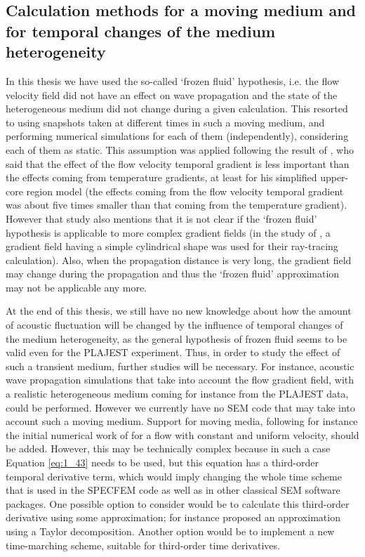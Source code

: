 \subsection*{Calculation methods for a moving medium and for temporal changes of the medium heterogeneity}

In this thesis we have used the so-called `frozen fluid' hypothesis, i.e. the flow velocity field did not have an effect on wave propagation
and the state of the heterogeneous medium did not change during a given calculation. This resorted to using snapshots taken at different times
in such a moving medium, and performing numerical simulations for each of them (independently), considering each of them as static.
This assumption was applied following the result of \cite{Massacret2012Simplifiedmodelingof}, who said that the effect of the flow velocity temporal gradient is less important
than the effects coming from temperature gradients, at least for his simplified upper-core region model
(the effects coming from the flow velocity temporal gradient was about five times smaller than that coming from the temperature gradient).
However that study also mentions that it is not clear if the `frozen fluid' hypothesis is applicable to more complex gradient fields
(in the study of \cite{Massacret2012Simplifiedmodelingof}, a gradient field having a simple cylindrical shape was used for their ray-tracing calculation).
Also, when the propagation distance is very long, the gradient field may change during the propagation and thus the `frozen fluid' approximation may not be applicable any more.

\noindent
At the end of this thesis, we still have no new knowledge about how the amount of acoustic fluctuation will be changed
by the influence of temporal changes of the medium heterogeneity, as the general hypothesis of frozen fluid seems to be valid even for the PLAJEST experiment.
Thus, in order to study the effect of such a transient medium, further studies will be necessary. For instance, acoustic wave propagation simulations
that take into account the flow gradient field, with a realistic heterogeneous medium coming for instance from the PLAJEST data, could be performed.
However we currently have no SEM code that may take into account such a moving medium. Support for moving media, following for instance the initial numerical work
of \cite{KaDu08} for a flow with constant and uniform velocity, should be added.
However, this may be technically complex because in such a case Equation \ref{eq:1_43} needs to be used,
but this equation has a third-order temporal derivative term, which would imply changing the whole time scheme that is used in the SPECFEM code as well
as in other classical SEM software packages.
One possible option to consider would be to calculate this third-order derivative using some approximation; \cite{Ashyralyev2007Anoteon} for instance
proposed an approximation using a Taylor decomposition.
Another option would be to implement a new time-marching scheme, suitable for third-order time derivatives.

